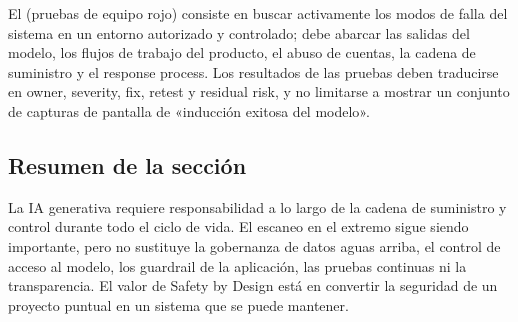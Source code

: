 El  (pruebas de equipo rojo) consiste en buscar activamente los modos de falla del sistema en un entorno autorizado y controlado; debe abarcar las salidas del modelo, los flujos de trabajo del producto, el abuso de cuentas, la cadena de suministro y el response process. Los resultados de las pruebas deben traducirse en owner, severity, fix, retest y residual risk, y no limitarse a mostrar un conjunto de capturas de pantalla de «inducción exitosa del modelo».


\subsection{Resumen de la sección}

La IA generativa requiere responsabilidad a lo largo de la cadena de suministro y control durante todo el ciclo de vida. El escaneo en el extremo sigue siendo importante, pero no sustituye la gobernanza de datos aguas arriba, el control de acceso al modelo, los guardrail de la aplicación, las pruebas continuas ni la transparencia. El valor de Safety by Design está en convertir la seguridad de un proyecto puntual en un sistema que se puede mantener.
